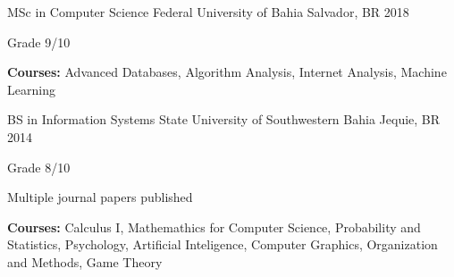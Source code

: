 

\begin{cventries}

  \cventry
    {MSc in Computer Science} %
    {Federal University of Bahia} %
    {Salvador, BR} %
    {2018} %
    {
      \begin{cvitems} %
        \item {Grade 9/10}
        \item {\textbf{Courses:} } Advanced Databases, Algorithm Analysis, Internet Analysis, Machine Learning
      \end{cvitems}
    }
    
  \cventry
    {BS in Information Systems} %
    {State University of Southwestern Bahia} %
    {Jequie, BR} %
    {2014} %
    {
      \begin{cvitems} %
        \item {Grade 8/10}
        \item {Multiple journal papers published}
        \item {\textbf{Courses:} } Calculus I, Mathemathics for Computer Science, Probability and Statistics, Psychology, Artificial Inteligence, Computer Graphics, Organization and Methods, Game Theory
      \end{cvitems}
    }
    
\end{cventries}
